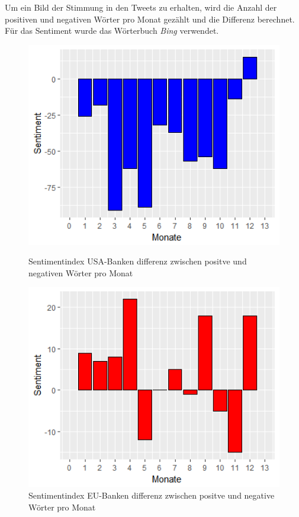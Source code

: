 Um ein Bild der Stimmung in den Tweets zu erhalten, wird die Anzahl der positiven und negativen Wörter pro Monat gezählt und die Differenz berechnet. Für das Sentiment wurde das Wörterbuch \textit{Bing} verwendet.
\begin{figure}[H]
	\begin{minipage}[b]{.4\linewidth} %
	\includegraphics[width=1\textwidth]{Pictures/Monatusa.png}
	\caption{Sentimentindex USA-Banken differenz  zwischen positve und negativen Wörter pro Monat}\label{usadiff}
	
\end{minipage}
	\hspace{.2\linewidth}
\begin{minipage}[b]{.4\linewidth} %
	\includegraphics[width=1\textwidth]{Pictures/Monateu.png}
	\caption{Sentimentindex EU-Banken differenz  zwischen positve und negative Wörter pro Monat}\label{eudiff}
\end{minipage}
\end{figure}
